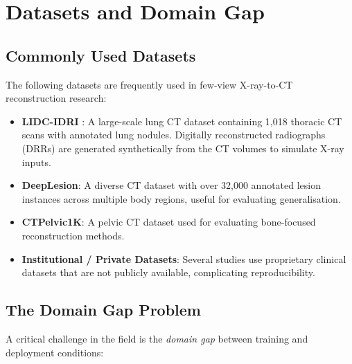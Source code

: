 
\section{Datasets and Domain Gap}
\label{sec:datasets}

\subsection{Commonly Used Datasets}

The following datasets are frequently used in few-view X-ray-to-CT reconstruction research:

\begin{itemize}
  \item \textbf{LIDC-IDRI} \cite{armato2011lidc}: A large-scale lung CT dataset containing 1,018 thoracic CT scans with annotated lung nodules. Digitally reconstructed radiographs (DRRs) are generated synthetically from the CT volumes to simulate X-ray inputs.

  \item \textbf{DeepLesion}: A diverse CT dataset with over 32,000 annotated lesion instances across multiple body regions, useful for evaluating generalisation.

  \item \textbf{CTPelvic1K}: A pelvic CT dataset used for evaluating bone-focused reconstruction methods.

  \item \textbf{Institutional / Private Datasets}: Several studies use proprietary clinical datasets that are not publicly available, complicating reproducibility.
\end{itemize}


\subsection{The Domain Gap Problem}

A critical challenge in the field is the \textit{domain gap} between training and deployment conditions:

